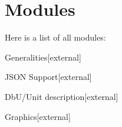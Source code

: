 \section{Modules}
Here is a list of all modules\-:\begin{DoxyCompactList}
\item {}
\item {}
\item Generalities{\ttfamily  \mbox{[}external\mbox{]}}\item J\-S\-O\-N Support{\ttfamily  \mbox{[}external\mbox{]}}\item Db\-U/\-Unit description{\ttfamily  \mbox{[}external\mbox{]}}\item Graphics{\ttfamily  \mbox{[}external\mbox{]}}\end{DoxyCompactList}
